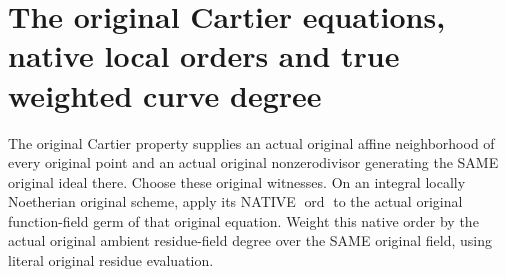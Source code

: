 \section{The original Cartier equations, native local orders and true weighted curve degree}

\begin{definition}
\label{def:fc-curve-cartier-original-equations}
\leanok
{}
The original Cartier property supplies an actual original affine neighborhood
of every original point and an actual original nonzerodivisor generating the
SAME original ideal there. Choose these original witnesses. On an integral
locally Noetherian original scheme, apply its NATIVE $\operatorname{ord}$ to
the actual original function-field germ of that original equation. Weight
this native order by the actual original ambient residue-field degree over
the SAME original field, using literal original residue evaluation.
\end{definition}


